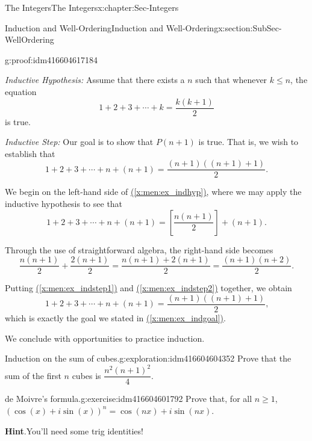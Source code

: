 \documentclass[oneside,10pt,]{book}
\numberwithin{equation}{section}
\renewcommand{\le}{\leqslant}
\renewcommand{\ge}{\geqslant}
\begin{document}
\begin{chapterptx}{The Integers}{}{The Integers}{}{}{x:chapter:Sec-Integers}
\begin{sectionptx}{Induction and Well-Ordering}{}{Induction and Well-Ordering}{}{}{x:section:SubSec-WellOrdering}
\begin{proofptx}{}{g:proof:idm416604617184}
\par
\emph{Inductive Hypothesis:} Assume that there exists a \(n\) such that whenever \(k \le n\), the equation%
\begin{equation}
1+ 2 + 3 + \cdots + k = \frac{k(k+1)}{2}\label{x:men:ex_indhyp}
\end{equation}
is true.%
\par
\emph{Inductive Step:} Our goal is to show that \(P(n+1)\) is true. That is, we wish to establish that%
\begin{equation}
1+ 2 + 3 + \cdots + n + (n+1) = \frac{(n+1)((n+1)+1)}{2}\text{.}\label{x:men:ex_indgoal}
\end{equation}
%
\par
We begin on the left-hand side of \hyperref[x:men:ex_indhyp]{(\ref{x:men:ex_indhyp})}, where we may apply the inductive hypothesis to see that%
\begin{equation}
1+ 2 + 3 + \cdots + n + (n+1) = \left[\frac{n(n+1)}{2}\right] + (n+1)\text{.}\label{x:men:ex_indstep1}
\end{equation}
%
\par
Through the use of straightforward algebra, the right-hand side becomes%
\begin{equation}
\frac{n(n+1)}{2} + \frac{2(n+1)}{2} = \frac{n(n+1) + 2(n+1)}{2} = \frac{(n+1)(n+2)}{2}\text{.}\label{x:men:ex_indstep2}
\end{equation}
%
\par
Putting \hyperref[x:men:ex_indstep1]{(\ref{x:men:ex_indstep1})} and \hyperref[x:men:ex_indstep2]{(\ref{x:men:ex_indstep2})} together, we obtain%
\begin{equation*}
1+ 2 + 3 + \cdots + n + (n+1) = \frac{(n+1)((n+1)+1)}{2}\text{,}
\end{equation*}
which is exactly the goal we stated in \hyperref[x:men:ex_indgoal]{(\ref{x:men:ex_indgoal})}.%
\end{proofptx}
We conclude with opportunities to practice induction.%
\begin{exploration}{Induction on the sum of cubes.}{g:exploration:idm416604604352}%
Prove that the sum of the first \(n\) cubes is \(\dfrac{n^2(n+1)^2}{4}\).%
\end{exploration}
\begin{inlineexercise}{de Moivre's formula.}{g:exercise:idm416604601792}%
Prove that, for all \(n\ge 1\), \((\cos(x) + i\sin (x))^n = \cos(nx) + i \sin(nx)\).%
\par\smallskip%
\noindent\textbf{Hint}.\hypertarget{g:hint:idm416604599376}{}\quad{}You'll need some trig identities!%

\end{inlineexercise}
\end{sectionptx}
\end{chapterptx}
\end{document}
